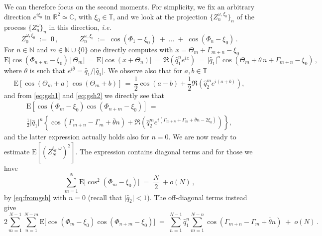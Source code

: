 \documentclass[a4paper,reqno,11pt]{amsart}
\numberwithin{equation}{section}
\newcommand{\bbT}{{\ensuremath{\mathbb T}} }
\newcommand{\go}{\omega}
\newcommand{\R}{\mathbb{R}}
\newcommand{\C}{\mathbb{C}}
\newcommand{\N}{\mathbb{N}}
\def\bE{\ensuremath{\bs{\mathrm{E}}}}
\def\bs{\boldsymbol}
\begin{document}
We can therefore focus on the second moments.
For simplicity, we fix an arbitrary direction $e^{i\xi_0}$
in $\R^2 \simeq \C$, with $\xi_0 \in \bbT$,
and we look at the projection 
$\{Z^{\go, \xi_0}_n\}_n$ of the process $\{Z^\go_n\}_n$
in this direction, {\sl i.e.}
\begin{equation}
    Z^{\go, \xi_0}_0 \;:=\; 0\,  , \qquad \quad Z^{\go, \xi_0}_n \;:=\; \cos(\Phi_1 - \xi_0)
    \;+\; \ldots \;+\; \cos(\Phi_n-\xi_0)\,.
\end{equation}
For $n\in\N$ and $m\in \N\cup\{0\}$
one directly computes with $x=\Theta_m + \Gamma_{m+n}-\xi_0$
\begin{equation}
\label{eq:gsh1}
\bE \big[ \cos(\Phi_{n+m}-\xi_0) \,\big|\, \Theta_m \big] \,=\,
    \bE \big[ \cos(x+\Theta_n) \big] 
    \,=\, \Re \left( \hat q_1^n e^{ix}\right) \, =\, 
    \vert \hat q_1\vert ^n \cos(\Theta_m + \bar \theta \,n+ \Gamma_{m+n}-\xi_0)\,,
\end{equation}
where $\bar \theta$ is such that
$e^{i \bar \theta} = \hat q_1/\vert \hat q_1\vert$.
We observe also that for $a,b\in \bbT$
\begin{equation}
\label{eq:gsh2}
\bE \left[  \cos(\Theta_{m}+a)\cos(\Theta_{m}+b) \right] \,=\,
\frac 12 \cos (a-b) + \frac 12 \Re \left( \hat q_2^me^{i(a+b)}\right),
\end{equation}
and from \eqref{eq:gsh1} and  \eqref{eq:gsh2}  we directly see that
\begin{multline}
\label{eq:fromgsh}
\bE \left[  \cos (\Phi_m -\xi_0) \cos (\Phi_{n+m} -\xi_0)\right]\, =\\
\frac 12 \vert \hat q_1\vert^n 
\left\{ \cos (\Gamma _{m+n}-\Gamma_m +\bar \theta n) 
+ \Re \left( \hat q _2^m e^{i(\Gamma _{m+n} +
\Gamma_m +\bar \theta n -2\xi_0)}\right) \right\},
\end{multline}
and the latter expression actually holds also for $n=0$.
We are now ready to estimate $\bE[(Z_N^{\xi_0, \go})^2]$. 
The expression contains diagonal terms and for those we have 
\begin{equation}
    \sum_{m=1}^N \bE\big[ \cos^2(\Phi_m-\xi_0) \big] \;=\; \frac{N}{2}\; + o(N)\,,
\end{equation}
 by \eqref{eq:fromgsh} with $n=0$
(recall that $\vert \hat q_2 \vert <1$). 
The off-diagonal terms instead give
\begin{equation}
    2\sum_{m=1}^{N-1} \sum_{n=1}^{N-m} \bE\big[ \cos(\Phi_m-\xi_0)
    \cos(\Phi_{n+m}-\xi_0) \big] \;=\;
    \sum_{n=1}^{N-1} \hat q_1^n \sum_{m=1}^{N-n} \cos(\Gamma_{m+n} - \Gamma_m+\bar \theta n) \;+\; o(N)\,.
\end{equation}
\end{document}
